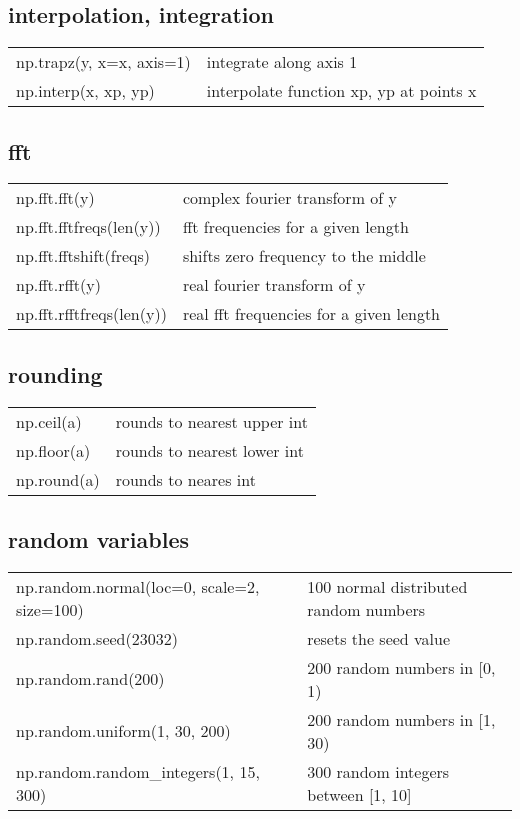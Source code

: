 \documentclass[10pt, a4paper, twocolumn]{article}
\begin{document}
\subsection*{interpolation, integration}
\begin{tabular}{ p{} p{} }
    np.trapz(y, x=x, axis=1) & integrate along axis 1\\
        np.interp(x, xp, yp) & interpolate function xp, yp at points x\\
\end{tabular}

\subsection*{fft}
\begin{tabular}{ p{} p{} }
               np.fft.fft(y) & complex fourier transform of y\\
     np.fft.fftfreqs(len(y)) & fft frequencies for a given length\\
    np.fft.fftshift(freqs)   & shifts zero frequency to the middle\\
               np.fft.rfft(y) & real fourier transform of y\\
     np.fft.rfftfreqs(len(y)) & real fft frequencies for a given length\\
\end{tabular}

\subsection*{rounding}
\begin{tabular}{ p{} p{} }
    np.ceil(a) & rounds to nearest upper int\\
   np.floor(a) & rounds to nearest lower int\\
   np.round(a) & rounds to neares int\\
\end{tabular}

\subsection*{random variables}
\begin{tabular}{ p{} p{} }
    np.random.normal(loc=0, scale=2, size=100) & 100 normal distributed random numbers\\
                         np.random.seed(23032) & resets the seed value\\
                           np.random.rand(200) & 200 random numbers in [0, 1)\\
         np.random.uniform(1, 30, 200)         & 200 random numbers in [1, 30)\\
        np.random.random\_integers(1, 15, 300) & 300 random integers between [1, 10]\\
\end{tabular}
\end{document}
